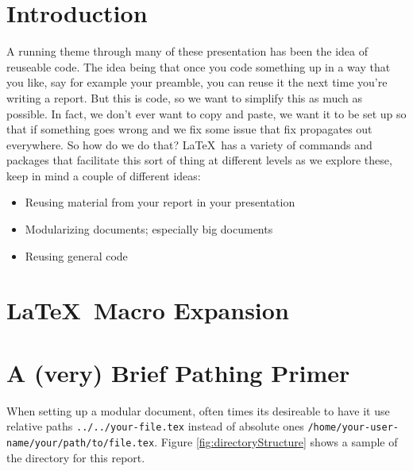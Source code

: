 \documentclass[hidelinks]{article}
\begin{document}
{}
    \section{Introduction}
        A running theme through many of these presentation has been the idea of reuseable code.
        The idea being that once you code something up in a way that you like, say for example your preamble, you can reuse it the next time you're writing a report.
        But this is code, so we want to simplify this as much as possible.
        In fact, we don't ever want to copy and paste, we want it to be set up so that if something goes wrong and we fix some issue that fix propagates out everywhere.
        So how do we do that?
        \LaTeX~has a variety of commands and packages that facilitate this sort of thing at different levels as we explore these, keep in mind a couple of different ideas:
        \begin{itemize}
            \item Reusing material from your report in your presentation
            \item Modularizing documents; especially big documents
            \item Reusing general code
        \end{itemize}
    \section{\LaTeX~Macro Expansion}
    \section{A (very) Brief Pathing Primer}
        When setting up a modular document, often times its desireable to have it use relative paths \texttt{../../your-file.tex} instead of absolute ones \texttt{/home/your-user-name/your/path/to/file.tex}.
        Figure \ref{fig:directoryStructure} shows a sample of the directory for this report.
\end{document}
